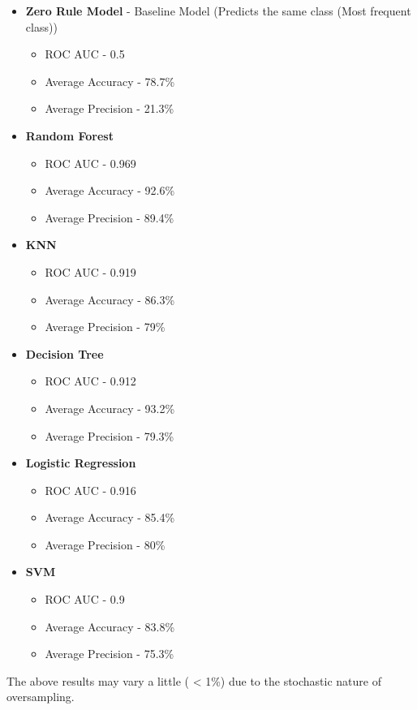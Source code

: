 \documentclass[10pt,twocolumn,letterpaper]{article}
\begin{document}
\begin{itemize}
    \item  \textbf{Zero Rule Model} - Baseline Model (Predicts the same class (Most frequent class))
	\begin{itemize}
	\item{ROC AUC - 0.5}
	\item{Average Accuracy - 78.7\%}
	\item{Average Precision - 21.3\%}
	\end{itemize}
    \item  \textbf{Random Forest}
	\begin{itemize}
	\item{ROC AUC - 0.969}
	\item{Average Accuracy - 92.6\%}
	\item{Average Precision - 89.4\%}
	\end{itemize}
    \item  \textbf{KNN} 
	\begin{itemize}
	\item{ROC AUC - 0.919}
	\item{Average Accuracy - 86.3\%}
	\item{Average Precision - 79\%}
	\end{itemize}
    \item  \textbf{Decision Tree} 
	\begin{itemize}
	\item{ROC AUC - 0.912}
	\item{Average Accuracy - 93.2\%}
	\item{Average Precision - 79.3\%}
	\end{itemize}
    \item  \textbf{Logistic Regression} 
	\begin{itemize}
	\item{ROC AUC - 0.916}
	\item{Average Accuracy - 85.4\%}
	\item{Average Precision - 80\%}
	\end{itemize}
    \item  \textbf{SVM} 
	\begin{itemize}
	\item{ROC AUC - 0.9}
	\item{Average Accuracy - 83.8\%}
	\item{Average Precision - 75.3\%}
	\end{itemize}
\end{itemize}

The above results may vary a little ( < 1\%) due to the stochastic nature of oversampling.
\end{document}
